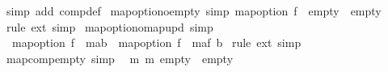 \begin{isabellebody}
\ {\isacharparenleft}{\kern0pt}simp\ add{\isacharcolon}{\kern0pt}\ comp{\isacharunderscore}{\kern0pt}def{\isacharparenright}{\kern0pt}%
\endisatagproof
{\isafoldproof}%
%
\isadelimproof
%
\endisadelimproof
%
\isadelimdocument
%
\endisadelimdocument
%
\isatagdocument
%
\isamarkuptrue%
%
\endisatagdocument
{\isafolddocument}%
%
\isadelimdocument
%
\endisadelimdocument
{}\isamarkupfalse%
\ map{\isacharunderscore}{\kern0pt}option{\isacharunderscore}{\kern0pt}o{\isacharunderscore}{\kern0pt}empty\ {\isacharbrackleft}{\kern0pt}simp{\isacharbrackright}{\kern0pt}{\isacharcolon}{\kern0pt}\ {\isachardoublequoteopen}map{\isacharunderscore}{\kern0pt}option\ f\ {\isasymcirc}\ empty\ {\isacharequal}{\kern0pt}\ empty{\isachardoublequoteclose}\isanewline
%
\isadelimproof
%
\endisadelimproof
%
\isatagproof
{}\isamarkupfalse%
\ {\isacharparenleft}{\kern0pt}rule\ ext{\isacharparenright}{\kern0pt}\ simp%
\endisatagproof
{\isafoldproof}%
%
\isadelimproof
\isanewline
%
\endisadelimproof
\isanewline
{}\isamarkupfalse%
\ map{\isacharunderscore}{\kern0pt}option{\isacharunderscore}{\kern0pt}o{\isacharunderscore}{\kern0pt}map{\isacharunderscore}{\kern0pt}upd\ {\isacharbrackleft}{\kern0pt}simp{\isacharbrackright}{\kern0pt}{\isacharcolon}{\kern0pt}\isanewline
\ \ {\isachardoublequoteopen}map{\isacharunderscore}{\kern0pt}option\ f\ {\isasymcirc}\ m{\isacharparenleft}{\kern0pt}a{\isasymmapsto}b{\isacharparenright}{\kern0pt}\ {\isacharequal}{\kern0pt}\ {\isacharparenleft}{\kern0pt}map{\isacharunderscore}{\kern0pt}option\ f\ {\isasymcirc}\ m{\isacharparenright}{\kern0pt}{\isacharparenleft}{\kern0pt}a{\isasymmapsto}f\ b{\isacharparenright}{\kern0pt}{\isachardoublequoteclose}\isanewline
%
\isadelimproof
%
\endisadelimproof
%
\isatagproof
{}\isamarkupfalse%
\ {\isacharparenleft}{\kern0pt}rule\ ext{\isacharparenright}{\kern0pt}\ simp%
\endisatagproof
{\isafoldproof}%
%
\isadelimproof
%
\endisadelimproof
%
\isadelimdocument
%
\endisadelimdocument
%
\isatagdocument
%
\isamarkuptrue%
%
\endisatagdocument
{\isafolddocument}%
%
\isadelimdocument
%
\endisadelimdocument
{}\isamarkupfalse%
\ map{\isacharunderscore}{\kern0pt}comp{\isacharunderscore}{\kern0pt}empty\ {\isacharbrackleft}{\kern0pt}simp{\isacharbrackright}{\kern0pt}{\isacharcolon}{\kern0pt}\isanewline
\ \ {\isachardoublequoteopen}m\ {\isasymcirc}\isactrlsub m\ empty\ {\isacharequal}{\kern0pt}\ empty{\isachardoublequoteclose}\isanewline

\end{isabellebody}
